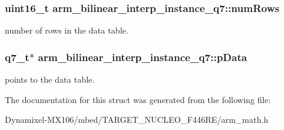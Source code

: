 \subsubsection[{\texorpdfstring{num\+Rows}{numRows}}]{\setlength{\rightskip}{0pt plus 5cm}uint16\+\_\+t arm\+\_\+bilinear\+\_\+interp\+\_\+instance\+\_\+q7\+::num\+Rows}\hypertarget{structarm__bilinear__interp__instance__q7_ad5a8067cab5f9ea4688b11a623e16607}{}\label{structarm__bilinear__interp__instance__q7_ad5a8067cab5f9ea4688b11a623e16607}
number of rows in the data table. 
\subsubsection[{\texorpdfstring{p\+Data}{pData}}]{\setlength{\rightskip}{0pt plus 5cm}q7\+\_\+t$\ast$ arm\+\_\+bilinear\+\_\+interp\+\_\+instance\+\_\+q7\+::p\+Data}\hypertarget{structarm__bilinear__interp__instance__q7_af05194d691bbefb02c34bafb22ca9ef0}{}\label{structarm__bilinear__interp__instance__q7_af05194d691bbefb02c34bafb22ca9ef0}
points to the data table. 

The documentation for this struct was generated from the following file\+:\begin{DoxyCompactItemize}
\item 
Dynamixel-\/\+M\+X106/mbed/\+T\+A\+R\+G\+E\+T\+\_\+\+N\+U\+C\+L\+E\+O\+\_\+\+F446\+R\+E/arm\+\_\+math.\+h\end{DoxyCompactItemize}
